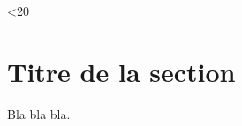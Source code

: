 \documentclass{article}
\begin{document}
\tableofcontents

\loop
	\ifnum\value{section}<20
		\section{Titre de la section}
		Bla bla bla.
\repeat
\end{document}
